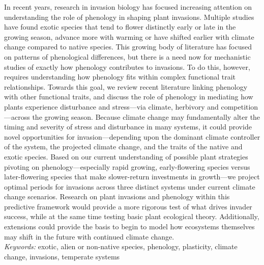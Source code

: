 \documentclass[11pt,a4paper,oneside]{article}
\begin{document}
 In recent years, research in invasion biology has focused increasing attention on understanding the role of phenology in shaping plant invasions. Multiple studies have found exotic species that tend to flower distinctly early or late in the growing season, advance more with warming or have shifted earlier with climate change compared to native species. This growing body of literature has focused on patterns of phenological differences, but there is a need now for mechanistic studies of exactly how phenology contributes to invasions. To do this, however, requires understanding how phenology fits within complex functional trait relationships. Towards this goal, we review recent literature linking phenology with other functional traits, and discuss the role of phenology in mediating how plants experience disturbance and stress---via climate, herbivory and competition---across the growing season. Because climate change may fundamentally alter the timing and severity of stress and disturbance in many systems, it could provide novel opportunities for invasion---depending upon the dominant climate controller of the system, the projected climate change, and the traits of the native and exotic species. Based on our current understanding of possible plant strategies pivoting on phenology---especially rapid growing, early-flowering species versus later-flowering species that make slower-return investments in growth---we project optimal periods for invasions across three distinct systems under current climate change scenarios. Research on plant invasions and phenology within this predictive framework would provide a more rigorous test of what drives invader success, while at the same time testing basic plant ecological theory. Additionally, extensions could provide the basis to begin to model how ecosystems themselves may shift in the future with continued climate change. \\

\noindent \emph{Keywords:} exotic, alien or non-native species, phenology, plasticity, climate change, invasions, temperate systems
\end{document}
